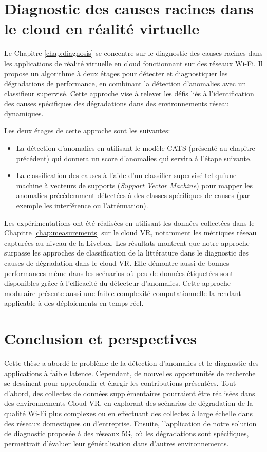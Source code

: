 \section*{Diagnostic des causes racines dans le cloud en réalité virtuelle}

Le Chapitre \ref{chap:diagnosis} se concentre sur le diagnostic des causes racines dans les applications de réalité virtuelle en cloud fonctionnant sur des réseaux Wi-Fi. Il propose un algorithme à deux étages pour détecter et diagnostiquer les dégradations de performance, en combinant la détection d'anomalies avec un classifieur supervisé. Cette approche vise à relever les défis liés à l’identification des causes spécifiques des dégradations dans des environnements réseau dynamiques.

Les deux étages de cette approche sont les suivantes:
\begin{itemize}
    \item La détection d'anomalies en utilisant le modèle CATS (présenté au chapitre précédent) qui donnera un score d'anomalies qui servira à l'étape suivante.
    \item La classification des causes à l'aide d'un classifier supervisé tel qu'une machine à vecteurs de supports (\textit{Support Vector Machine}) pour mapper les anomalies précédemment détectées à des classes spécifiques de causes (par exemple les interférence ou l'atténuation).
\end{itemize}

Les expérimentations ont été réalisées en utilisant les données collectées dans le Chapitre \ref{chap:measurements} sur le cloud VR, notamment les métriques réseau capturées au niveau de la Livebox. Les résultats montrent que notre approche surpasse les approches de classification de la littérature dans le diagnostic des causes de dégradation dans le cloud VR. Elle démontre aussi de bonnes performances même dans les scénarios où peu de données étiquetées sont disponibles grâce à l'efficacité du détecteur d'anomalies. Cette approche modulaire présente aussi une faible complexité computationnelle la rendant applicable à des déploiements en temps réel.


\section*{Conclusion et perspectives}

Cette thèse a abordé le problème de la détection d'anomalies et le diagnostic des applications à faible latence. Cependant, de nouvelles opportunités de recherche se dessinent pour approfondir et élargir les contributions présentées. Tout d'abord, des collectes de données supplémentaires pourraient être réalisées dans des environnements Cloud VR, en explorant des scénarios de dégradation de la qualité Wi-Fi plus complexes ou en effectuant des collectes à large échelle dans des réseaux domestiques ou d’entreprise. Ensuite, l’application de notre solution de diagnostic proposée à des réseaux 5G, où les dégradations sont spécifiques, permettrait d’évaluer leur généralisation dans d'autres environnements.

